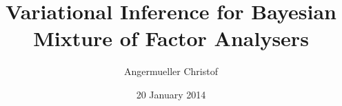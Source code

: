 \documentclass[a4paper]{article}
\author{Angermueller Christof}
\date{20 January 2014}
\title{Variational Inference for Bayesian Mixture of Factor Analysers}
\begin{document}
\maketitle

\newcommand{\bs}{\boldsymbol}
\newcommand{\Xp}{\bs{\pi}}
\newcommand{\Xbl}{\bar{\Lambda^s}}
\newcommand{\Xn}{\bs{\nu}^s}
\newcommand{\Xe}{\Psi}
\newcommand{\Xa}{\alpha}
\newcommand{\Xc}{\Xl{\Xl}^T}

\newcommand{\Xl}{\Lambda^s}
\newcommand{\Xlv}{\Lambda^{p,s}}
\newcommand{\Xlvll}{\Xlv_{\Lambda\Lambda}}
\newcommand{\Xlvlu}{\Xlv_{\Lambda\mu}}
\newcommand{\Xlvul}{\Xlv_{\mu\Lambda}}
\newcommand{\Xlvuu}{\Xlv_{\mu\mu}}
\newcommand{\Xlt}{\tilde{\Lambda}^s}
\newcommand{\Xltm}{\bar{\tilde{\bs{\Lambda}}}^s}
\newcommand{\Xltmq}{\bar{\tilde{\Lambda}}^s_q}
\newcommand{\Xltv}{\tilde{\Gamma}^{p,s}}

\newcommand{\Xx}{\bs{x}^n}
\newcommand{\Xxm}{\overline{\bs{x}}^{n,s}}
\newcommand{\Xxv}{\Sigma^s}

\newcommand{\Xsp}{\Sigma^{p,s}}
\newcommand{\Xxs}{\Sigma^s}
\newcommand{\Xlm}{\overline{\Lambda}^s}
\newcommand{\Xls}{\Sigma^{p,s}}
\newcommand{\Xpsii}{\Psi^{-1}}
\newcommand{\Xy}{\bs{y}^n}
\newcommand{\Xs}{s^n}
\newcommand{\Xcov}{\operatorname{cov}}
\newcommand{\Xvar}{\operatorname{var}}
\newcommand{\Xtr}{\operatorname{tr}}
\newcommand{\Xdiag}{\operatorname{diag}}
\end{document}
